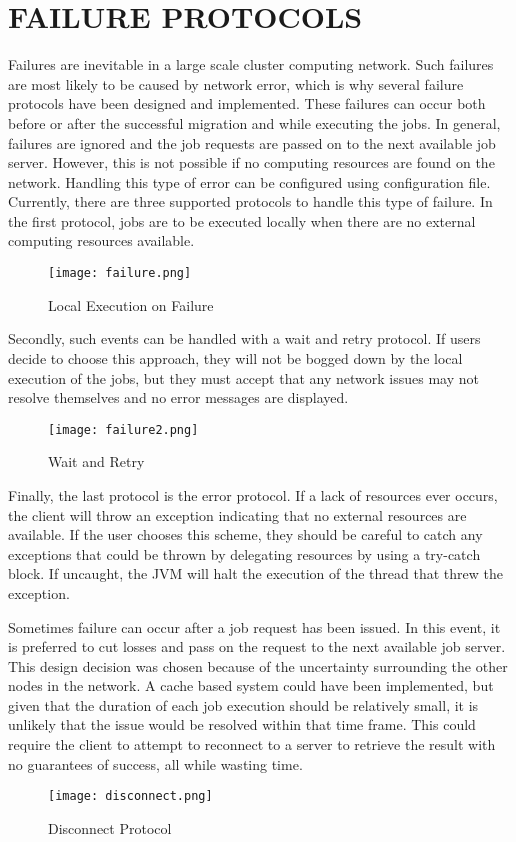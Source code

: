 \section{FAILURE PROTOCOLS}\label{sec:failureProtocols}

Failures are inevitable in a large scale cluster computing network.
Such failures are most likely to be caused by network error, which
is why several failure protocols have been designed and implemented.
These failures can occur both before or after the successful
migration and while executing the jobs.
In general, failures are ignored and the job requests are passed
on to the next available job server.
However, this is not possible if no computing resources are
found on the network.
Handling this type of error can be configured
using configuration file.
Currently, there are three supported protocols to handle
this type of failure.
In the first protocol, jobs are to be executed locally when
there are no external computing resources available.

\begin{figure}[H]
    \centering
    \texttt{[image: failure.png]}
    \caption{Local Execution on Failure}
\end{figure}

Secondly, such events can be handled with a wait and retry protocol.
If users decide to choose this approach, they will not be bogged down
by the local execution of the jobs, but they must accept that any network
issues may not resolve themselves and no error messages are displayed.

\begin{figure}[H]
    \centering
    \texttt{[image: failure2.png]}
    \caption{Wait and Retry}
\end{figure}

Finally, the last protocol is the error protocol.
If a lack of resources ever occurs, the client will
throw an exception indicating that no external resources
are available.
If the user chooses this scheme, they should be careful
to catch any exceptions that could be thrown by delegating
resources by using a try-catch block.
If uncaught, the JVM will halt the execution of the thread
that threw the exception.

Sometimes failure can occur after a job request has been issued.
In this event, it is preferred to cut losses and pass on the request
to the next available job server.
This design decision was chosen because of the uncertainty surrounding
the other nodes in the network.
A cache based system could have been implemented, but given that the duration
of each job execution should be relatively small, it is unlikely that the issue
would be resolved within that time frame.
This could require the client to attempt to reconnect to a server to retrieve
the result with no guarantees of success, all while wasting time.

\begin{figure}[H]
    \centering
    \texttt{[image: disconnect.png]}
    \caption{Disconnect Protocol}
\end{figure}
